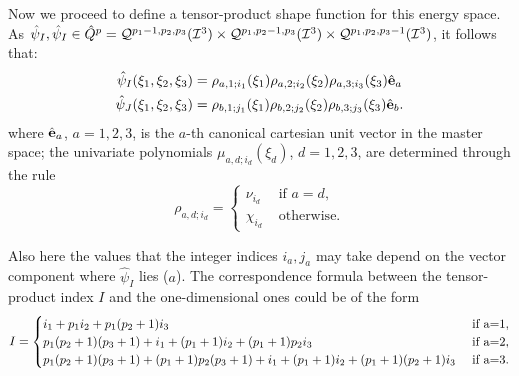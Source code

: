 Now we proceed to define a tensor-product shape function for this energy space. As $\hat{\psi}_I,\hat{\psi}_I\in \hat{Q}^p=\mathcal{Q}^{p_1-1,p_2,p_3}(\mathcal{I}^3)\times\mathcal{Q}^{p_1,p_2-1,p_3}(\mathcal{I}^3)\times\mathcal{Q}^{p_1,p_2,p_3-1}(\mathcal{I}^3)$, it follows that:
\begin{equation}
    \begin{aligned}
    \hat{\psi}_I(\xi_1,\xi_2,\xi_3)&= \rho_{a,1;i_1}(\xi_1)\rho_{a,2;i_2}(\xi_2)\rho_{a,3;i_3}(\xi_3)\hat{\mathbf{e}}_a\\
    \hat{\psi}_J(\xi_1,\xi_2,\xi_3)&= \rho_{b,1;j_1}(\xi_1)\rho_{b,2;j_2}(\xi_2)\rho_{b,3;j_3}(\xi_3)\hat{\mathbf{e}}_b.
    \end{aligned}
    \label{hcurltensor}
\end{equation}
%
where $\hat{\mathbf{e}}_a$, $a=1,2,3$, is the $a$-th canonical cartesian unit vector in the master space; the univariate polynomials $\mu_{a,d;i_d}(\xi_d)$, $d=1,2,3$, are determined through the rule
\begin{equation}
    \rho_{a,d;i_d}=  \begin{cases}
                    \nu_{i_d}&\text{ if }a=d,\\
                    \chi_{i_d} &\text{ otherwise.}
                    \end{cases}
    \label{hcurlrule}
\end{equation}

Also here the values that the integer indices $i_a,j_a$ may take depend on the vector component where $\hat{\psi}_I$ lies ($a$). The correspondence formula between the tensor-product index $I$ and the one-dimensional ones could be of the form
\begin{equation}
    I=  \begin{cases}
            i_1+p_1i_2+p_1(p_2+1)i_3 & \text{ if }$a=1$,\\
            p_1(p_2+1)(p_3+1)+i_1+(p_1+1)i_2+(p_1+1)p_2i_3 & \text{ if }$a=2$,\\
            p_1(p_2+1)(p_3+1)+(p_1+1)p_2(p_3+1)+i_1+(p_1+1)i_2+(p_1+1)(p_2+1)i_3 & \text{ if }$a=3$.
        \end{cases}
        \label{hcurltensorindex}
\end{equation}

